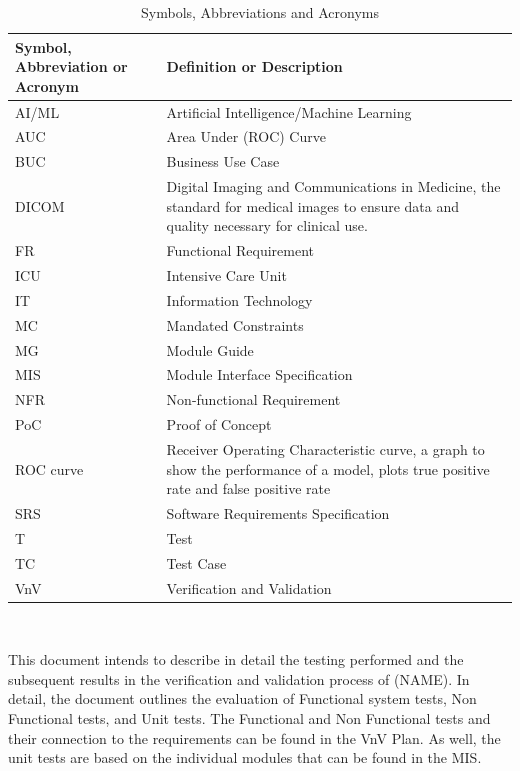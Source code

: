 \documentclass[12pt, titlepage]{article}
\begin{document}
\renewcommand{\arraystretch}{1.2}
\begin{table}[H]
    \centering
    \label{tab:symbsAbbrevsAcros}
    \begin{tabular}{p{1.25in}p{3.75in}}
        \toprule
        \textbf{Symbol, Abbreviation or Acronym} & \textbf{Definition or Description} \\
        \midrule
        AI/ML & Artificial Intelligence/Machine Learning \\
        AUC & Area Under (ROC) Curve \\
        BUC & Business Use Case \\
        DICOM & Digital Imaging and Communications in Medicine, the standard for medical images to ensure data and quality necessary for clinical use.\\
        FR & Functional Requirement \\
        ICU & Intensive Care Unit \\
        IT & Information Technology \\
        MC & Mandated Constraints \\
        MG & Module Guide \\
        MIS & Module Interface Specification \\
        NFR & Non-functional Requirement \\
        PoC & Proof of Concept\\
        ROC curve & Receiver Operating Characteristic curve, a graph to show the performance of a model, plots true positive rate and false positive rate \\
        SRS & Software Requirements Specification \\
        T & Test \\
        TC & Test Case \\
        VnV & Verification and Validation \\
        \bottomrule
    \end{tabular}\\
    \caption{Symbols, Abbreviations and Acronyms}
\end{table}

\newpage

\tableofcontents

\listoftables %

\listoffigures %

\newpage


This document intends to describe in detail the testing performed and the subsequent results in the verification and validation process of (NAME). In detail, the document outlines the evaluation of Functional system tests, Non Functional tests, and Unit tests. The Functional and Non Functional tests and their connection to the requirements can be found in the VnV Plan. As well, the unit tests are based on the individual modules that can be found in the MIS.  
\end{document}
